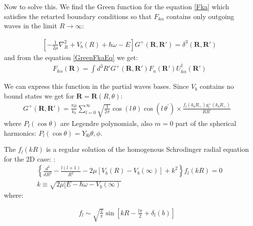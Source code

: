 Now to solve this. We find the Green function for the equation \eqref{Fka} which satisfies the retarted boundary conditions so that $ F_{k\alpha} $ contains only outgoing waves in the limit $ R \rightarrow \infty $:

\begin{equation}\label{GreenFkaEq}
\begin{split}
& \left[-\frac{1}{2\mu}\nabla^2_{R} + V_b(R) + \hbar\omega - E\right]G^{+}(\mathbf{R}, \mathbf{R}') =  \delta^3(\mathbf{R}, \mathbf{R}')
\end{split}
\end{equation}
and from the equation \eqref{GreenFkaEq} we get:
\begin{equation}\label{FkaInt}
\begin{split}
& F_{k\alpha}(\mathbf{R}) = \int{d^3R'G^{+}(\mathbf{R}, \mathbf{R}')F_{a}(\mathbf{R}')U^{\dagger}_{k\alpha}(\mathbf{R}')   }
\end{split}
\end{equation}

We can express this function in the partial waves bases. Since $ V_b $ contains no bound states we get for $ \mathbf{R} = \mathbf{R}(R,\theta) $:
\begin{equation}\label{GreenFka}
\begin{split}
G^{+}(\mathbf{R}, \mathbf{R}') =  \frac{\pi\mu}{k_b}\sum_{l=0}^{\infty}{\sqrt{\frac{1}{2\pi}}\cos(l\,\theta)\cos(l\,\theta^{'})}\times \frac{f_l(k_bR_{<})g^{+}_l(k_bR_{>})}{RR'}
\end{split}
\end{equation}
where $ P_l(\cos\theta) $ are Legendre polynomials, also $ m = 0 $ part of the spherical harmonics:  $ P_l(\cos\theta) = Y_{l0}{\theta,\phi} $. 

The $ f_l(k R) $ is a regular solution of the homogenous Schrodinger radial  equation for the 2D case: \cite{H2atom}:
\begin{equation}\label{eqRadial1}
\begin{split}
& \left\{\frac{d^2}{dR^2} - \frac{l(l+1)}{R^2} - 2\mu\left[V_b(R) - V_b(\infty)\right] + k^2\right\}f_l(kR) = 0 \\[.8em]
& k \equiv \sqrt{2\mu[E - \hbar\omega - V_b(\infty)}
\end{split}
\end{equation}
where:

\begin{equation}
\begin{split}
f_{l} \sim \sqrt{\frac{2}{\pi}}\sin\left[kR - \frac{l\pi}{2} + \delta_l(b)\right]
\end{split}
\end{equation}

